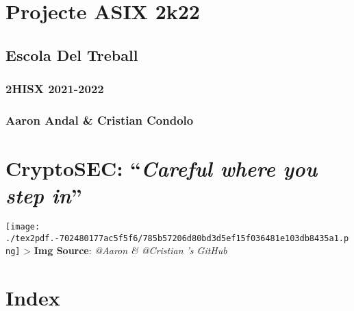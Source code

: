 \documentclass[]{article}
\date{}
\begin{document}
\hypertarget{projecte-asix-2k22}{%
\section{\texorpdfstring{\textbf{Projecte ASIX
2k22}}{Projecte ASIX 2k22}}\label{projecte-asix-2k22}}

\hypertarget{escola-del-treball}{%
\subsection{\texorpdfstring{\textbf{Escola Del
Treball}}{Escola Del Treball}}\label{escola-del-treball}}

\hypertarget{hisx-2021-2022}{%
\subsubsection{\texorpdfstring{\textbf{2HISX
2021-2022}}{2HISX 2021-2022}}\label{hisx-2021-2022}}

\hypertarget{aaron-andal-cristian-condolo}{%
\subsubsection{\texorpdfstring{\textbf{Aaron Andal \& Cristian
Condolo}}{Aaron Andal \& Cristian Condolo}}\label{aaron-andal-cristian-condolo}}

\hypertarget{cryptosec-careful-where-you-step-in}{%
\section{\texorpdfstring{\textbf{CryptoSEC}: ``\emph{Careful where you
step
in}''}{CryptoSEC: ``Careful where you step in''}}\label{cryptosec-careful-where-you-step-in}}

\texttt{[image: ./tex2pdf.-702480177ac5f5f6/785b57206d80bd3d5ef15f036481e103db8435a1.png]}
\textgreater{} \textbf{Img Source}: \emph{@Aaron \& @Cristian 's GitHub}

\hypertarget{index}{%
\section{\texorpdfstring{\textbf{Index}}{Index}}\label{index}}
\end{document}
